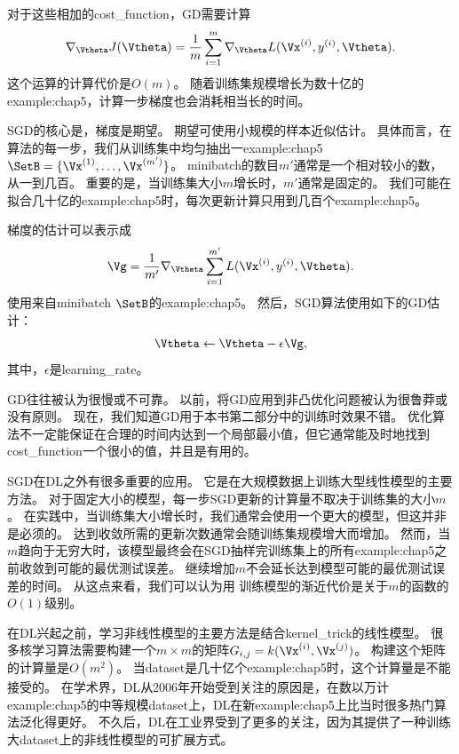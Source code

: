 对于这些相加的\gls{cost_function}，\gls{GD}需要计算
\begin{equation}
    \nabla_{\Vtheta} J(\Vtheta)
    = \frac{1}{m} \sum_{i=1}^m  
    \nabla_{\Vtheta} L(\Vx^{(i)}, y^{(i)}, \Vtheta) .
\end{equation}
这个运算的计算代价是$O(m)$。
随着训练集规模增长为数十亿的\gls{example:chap5}，计算一步梯度也会消耗相当长的时间。

\gls{SGD}的核心是，梯度是期望。
期望可使用小规模的样本近似估计。
具体而言，在算法的每一步，我们从训练集中均匀抽出一\gls{example:chap5} $\SetB=\{\Vx^{(1)},\dots,\Vx^{(m')}\}$。
\gls{minibatch}的数目$m'$通常是一个相对较小的数，从一到几百。
重要的是，当训练集大小$m$增长时，$m'$通常是固定的。
我们可能在拟合几十亿的\gls{example:chap5}时，每次更新计算只用到几百个\gls{example:chap5}。

梯度的估计可以表示成
\begin{equation}
    \Vg = \frac{1}{m'} \nabla_{\Vtheta} \sum_{i=1}^{m'}
    L(\Vx^{(i)}, y^{(i)}, \Vtheta).
\end{equation}
使用来自\gls{minibatch} $\SetB$的\gls{example:chap5}。
然后，\gls{SGD}算法使用如下的\gls{GD}估计：
\begin{equation}
    \Vtheta \leftarrow \Vtheta - \epsilon \Vg,
\end{equation}
其中，$\epsilon$是\gls{learning_rate}。

\gls{GD}往往被认为很慢或不可靠。
以前，将\gls{GD}应用到非凸优化问题被认为很鲁莽或没有原则。
现在，我们知道\gls{GD}用于本书第二部分中的训练时效果不错。
优化算法不一定能保证在合理的时间内达到一个局部最小值，但它通常能及时地找到\gls{cost_function}一个很小的值，并且是有用的。


\gls{SGD}在\gls{DL}之外有很多重要的应用。
它是在大规模数据上训练大型线性模型的主要方法。
对于固定大小的模型，每一步\gls{SGD}更新的计算量不取决于训练集的大小$m$。
在实践中，当训练集大小增长时，我们通常会使用一个更大的模型，但这并非是必须的。
达到收敛所需的更新次数通常会随训练集规模增大而增加。
然而，当$m$趋向于无穷大时，该模型最终会在\gls{SGD}抽样完训练集上的所有\gls{example:chap5}之前收敛到可能的最优测试误差。
继续增加$m$不会延长达到模型可能的最优测试误差的时间。
从这点来看，我们可以认为用\,\,训练模型的渐近代价是关于$m$的函数的$O(1)$级别。

在\gls{DL}兴起之前，学习非线性模型的主要方法是结合\gls{kernel_trick}的线性模型。
很多核学习算法需要构建一个$m\times m$的矩阵$G_{i,j}=k(\Vx^{(i)}, \Vx^{(j)})$。
构建这个矩阵的计算量是$O(m^2)$。
当\gls{dataset}是几十亿个\gls{example:chap5}时，这个计算量是不能接受的。
在学术界，\gls{DL}从2006年开始受到关注的原因是，在数以万计\gls{example:chap5}的中等规模\gls{dataset}上，\gls{DL}在新\gls{example:chap5}上比当时很多热门算法泛化得更好。
不久后，\gls{DL}在工业界受到了更多的关注，因为其提供了一种训练大\gls{dataset}上的非线性模型的可扩展方式。

